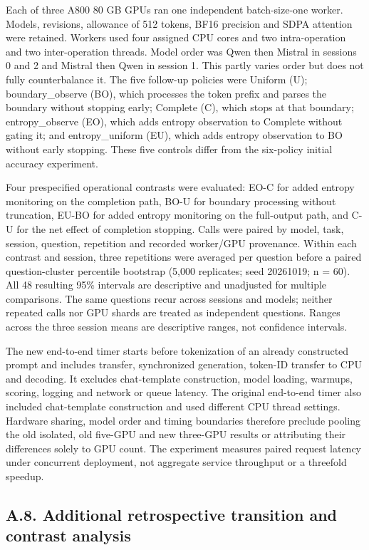 \documentclass[
  12pt,
  a4paper,
]{article}
\begin{document}
Each of three A800 80 GB GPUs ran one independent batch-size-one worker.
Models, revisions, allowance of 512 tokens, BF16 precision and SDPA
attention were retained. Workers used four assigned CPU cores and two
intra-operation and two inter-operation threads. Model order was Qwen
then Mistral in sessions 0 and 2 and Mistral then Qwen in session 1.
This partly varies order but does not fully counterbalance it. The five
follow-up policies were Uniform (U); boundary\_observe (BO), which
processes the token prefix and parses the boundary without stopping
early; Complete (C), which stops at that boundary; entropy\_observe
(EO), which adds entropy observation to Complete without gating it; and
entropy\_uniform (EU), which adds entropy observation to BO without
early stopping. These five controls differ from the six-policy initial
accuracy experiment.

Four prespecified operational contrasts were evaluated: EO-C for added
entropy monitoring on the completion path, BO-U for boundary processing
without truncation, EU-BO for added entropy monitoring on the
full-output path, and C-U for the net effect of completion stopping.
Calls were paired by model, task, session, question, repetition and
recorded worker/GPU provenance. Within each contrast and session, three
repetitions were averaged per question before a paired question-cluster
percentile bootstrap (5,000 replicates; seed 20261019; n = 60). All 48
resulting 95\% intervals are descriptive and unadjusted for multiple
comparisons. The same questions recur across sessions and models;
neither repeated calls nor GPU shards are treated as independent
questions. Ranges across the three session means are descriptive ranges,
not confidence intervals.

The new end-to-end timer starts before tokenization of an already
constructed prompt and includes transfer, synchronized generation,
token-ID transfer to CPU and decoding. It excludes chat-template
construction, model loading, warmups, scoring, logging and network or
queue latency. The original end-to-end timer also included chat-template
construction and used different CPU thread settings. Hardware sharing,
model order and timing boundaries therefore preclude pooling the old
isolated, old five-GPU and new three-GPU results or attributing their
differences solely to GPU count. The experiment measures paired request
latency under concurrent deployment, not aggregate service throughput or
a threefold speedup.

\subsection{A.8. Additional retrospective transition and contrast
analysis}\label{a.8.-additional-retrospective-transition-and-contrast-analysis}
\end{document}
